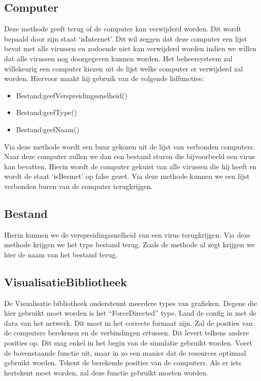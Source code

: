 \documentclass[a4paper,oneside]{report}
\begin{document}
\subsection{Computer}
 Deze methode geeft terug of de computer kan verwijderd worden. Dit wordt bepaald door zijn staat ‘isInternet’. Dit wil zeggen dat deze computer een lijst bevat met alle virussen en zodoende niet kan verwijderd worden indien we willen dat alle virussen nog doorgegeven kunnen worden.
 Het beheersysteem zal willekeurig een computer kiezen uit de lijst welke computer er verwijderd zal worden. Hiervoor maakt hij gebruik van de volgende lidfuncties:
\begin{itemize}
    \item Bestand:geefVerspreidingssnelheid()
    \item Bestand:geefType()
    \item Bestand:geefNaam()
\end{itemize}
 Via deze methode wordt een buur gekozen uit de lijst van verbonden computers. Naar deze computer zullen we dan een bestand sturen die bijvoorbeeld een virus kan bevatten.
 Hierin wordt de computer gekuist van alle virussen die hij heeft en wordt de staat ‘isBesmet’ op false gezet.
 Via deze methode kunnen we een lijst verbonden buren van de computer terugkrijgen.
\subsection{Bestand}
 Hierin kunnen we de verspreidingssnelheid van een virus terugkrijgen.
 Via deze methode krijgen we het type bestand terug.
 Zoals de methode al zegt krijgen we hier de naam van het bestand terug.
\subsection{VisualisatieBibliotheek}
 De Visualisatie bibliotheek ondersteunt meerdere types van grafieken. Degene die hier gebruikt moet worden is het “ForceDirected” type.
 Laad de config in met de data van het netwerk. Dit moet in het correcte formaat zijn.
 Zal de posities van de computers berekenen en de verbindingen ertussen. Dit levert telkens andere posities op. Dit mag enkel in het begin van de simulatie gebruikt worden.
 Voert de bovenstaande functie uit, maar in zo een manier dat de resources optimaal gebruikt worden.
 Tekent de berekende posities van de computers. Als er iets hertekent moet worden, zal deze functie gebruikt moeten worden.
\eindlemma
\end{document}
